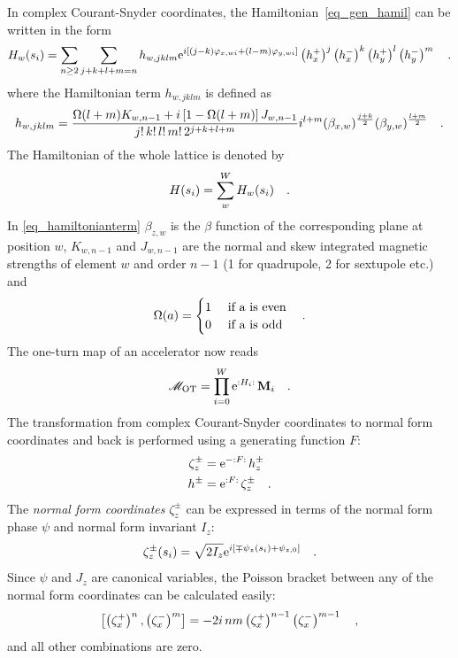 In complex Courant-Snyder coordinates, the Hamiltonian~\eqref{eq_gen_hamil} can be written in the form
%
\begin{equation}
    H_w(s_i) = \sum\limits_{n\geq2} \sum\limits_{j+k+l+m=n} h_{w,jklm}
    \text{e}^{i \left[
        (j-k) \varphi_{x,wi} + (l-m) \varphi_{y,wi}
    \right]}
    \left(h_x^+\right)^j
    \left(h_x^-\right)^k
    \left(h_y^+\right)^l
    \left(h_y^-\right)^m
    \quad .
\end{equation}
%
where the Hamiltonian term $h_{w,jklm}$ is defined as
%
\begin{equation}
    h_{w,jklm} = 
    \frac{
        \Omega(l+m) K_{w,n-1} + i\left[1-\Omega(l+m)\right] J_{w,n-1}
    }{
        j!\,k!\,l!\,m!\,2^{j+k+l+m}
    }
    i^{l+m}
    (\beta_{x,w})^{\frac{j+k}{2}}
    (\beta_{y,w})^{\frac{l+m}{2}}
    \quad .
    \label{eq_hamiltonianterm}
\end{equation}
%
The Hamiltonian of the whole lattice is denoted by
%
\begin{equation}
    H(s_i) = \sum\limits_w^W H_w(s_i)
    \label{eq_Hamil_sa}
    \quad .
\end{equation}
%
In \eqref{eq_hamiltonianterm} $\beta_{z,w}$ is the $\beta$ function of the corresponding plane at position $w$,
$K_{w,n-1}$ and $J_{w,n-1}$ are the normal and skew integrated magnetic strengths of element $w$ and order $n-1$ (1 for quadrupole, 2 for sextupole etc.)
and 
%
\begin{equation}
    \Omega(a) = 
    \begin{cases}
        1 &\text{ if a is even} \\
        0 &\text{ if a is odd} \\
    \end{cases}
    \quad .
\end{equation}
%
The one-turn map of an accelerator now reads
%
\begin{equation}
    \mathscr{M}_\text{OT} = \prod\limits_{i=0}^W \text{e}^{{:}H_i{:}\,} \mathbf{M}_i
    \quad .
\end{equation}
%
The transformation from complex Courant-Snyder coordinates to normal form coordinates and back is performed
using a generating function $F$:
%
\begin{align}
    \zeta_z^\pm &= \text{e}^{-{:}F{:}\,} h_z^\pm 
    \label{eq_z_from_h} \\
    h^\pm &= \text{e}^{{:}F{:}\,} \zeta_z^\pm
    \label{eq_h_from_z}
    \quad .
\end{align}
%
The \emph{normal form coordinates} $\zeta_z^\pm$
can be expressed in terms of the normal form phase $\psi$ and normal form invariant $I_z$:
%
\begin{equation}
    \zeta_z^\pm(s_i) = \sqrt{2I_z}\text{e}^{i\left[\mp \psi_z(s_i) + \psi_{z,0} \right]}
    \quad .
\end{equation}
%
Since $\psi$ and $J_z$ are canonical variables, the Poisson bracket between any of the normal form
coordinates can be calculated easily:
%
\begin{equation}
    \left[ \left(\zeta_x^+\right)^{n}, \left(\zeta_x^-\right)^{m}\right] = -2i\,nm\left(\zeta_x^+\right)^{n-1}\left(\zeta_x^-\right)^{m-1}
    \quad ,
    \label{eq_poiss_br_ident}
\end{equation}
and all other combinations are zero.
%

